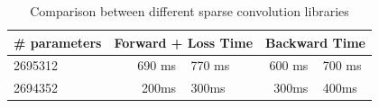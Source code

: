 \documentclass[10pt,twocolumn,letterpaper]{article}
\begin{document}
\begin{table}
\begin{center}
\begin{tabular}{|l c c|}
\hline
 \# parameters & Forward + Loss Time &  Backward Time \\
\hline\hline
 2695312  &  690 ms ~ 770 ms  & 600 ms ~ 700 ms \\
2694352  & 200ms ~ 300ms  & 300ms ~ 400ms \\
\hline
\end{tabular}
\end{center}
\caption{Comparison between different sparse convolution libraries}
\label{tab:sparseconv}
\end{table}
\end{document}
